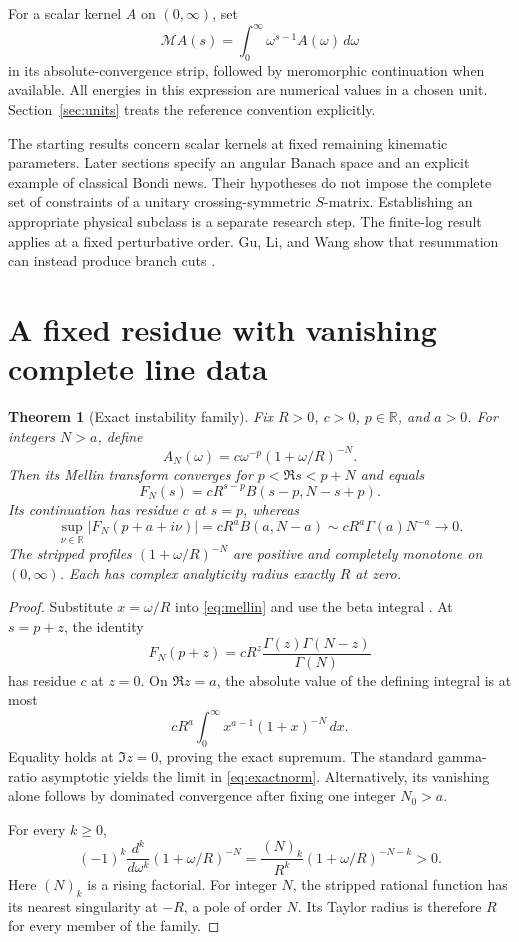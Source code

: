 \documentclass[11pt]{article}
\newtheorem{theorem}{Theorem}
\theoremstyle{remark}\newtheorem{remark}[theorem]{Remark}
\newcommand{\Mell}{\mathcal M}
\begin{document}
For a scalar kernel $A$ on $(0,\infty)$, set
\begin{equation}\label{eq:mellin}
 \Mell A(s)=\int_0^\infty \omega^{s-1}A(\omega)\,d\omega
\end{equation}
in its absolute-convergence strip, followed by meromorphic continuation when available. All energies in this expression are numerical values in a chosen unit. Section~\ref{sec:units} treats the reference convention explicitly.

The starting results concern scalar kernels at fixed remaining kinematic parameters. Later sections specify an angular Banach space and an explicit example of classical Bondi news. Their hypotheses do not impose the complete set of constraints of a unitary crossing-symmetric $S$-matrix. Establishing an appropriate physical subclass is a separate research step. The finite-log result applies at a fixed perturbative order. Gu, Li, and Wang show that resummation can instead produce branch cuts \cite{gu}.

\section{A fixed residue with vanishing complete line data}
\begin{theorem}[Exact instability family]\label{thm:instability}
Fix $R>0$, $c>0$, $p\in\mathbb R$, and $a>0$. For integers $N>a$, define
\begin{equation}\label{eq:family}
 A_N(\omega)=c\omega^{-p}(1+\omega/R)^{-N}.
\end{equation}
Then its Mellin transform converges for $p<\Re s<p+N$ and equals
\begin{equation}\label{eq:beta}
 F_N(s)=cR^{s-p}B(s-p,N-s+p).
\end{equation}
Its continuation has residue $c$ at $s=p$, whereas
\begin{equation}\label{eq:exactnorm}
 \sup_{\nu\in\mathbb R}|F_N(p+a+i\nu)|
 =cR^a B(a,N-a)
 \sim cR^a\Gamma(a)N^{-a}\longrightarrow0.
\end{equation}
The stripped profiles $(1+\omega/R)^{-N}$ are positive and completely monotone on $(0,\infty)$. Each has complex analyticity radius exactly $R$ at zero.
\end{theorem}
\begin{proof}
Substitute $x=\omega/R$ into \eqref{eq:mellin} and use the beta integral \cite{dlmfbeta}. At $s=p+z$, the identity
\[
 F_N(p+z)=cR^z\frac{\Gamma(z)\Gamma(N-z)}{\Gamma(N)}
\]
has residue $c$ at $z=0$. On $\Re z=a$, the absolute value of the defining integral is at most
\[
 cR^a\int_0^\infty x^{a-1}(1+x)^{-N}\,dx.
\]
Equality holds at $\Im z=0$, proving the exact supremum. The standard gamma-ratio asymptotic yields the limit in \eqref{eq:exactnorm}. Alternatively, its vanishing alone follows by dominated convergence after fixing one integer $N_0>a$.

For every $k\ge0$,
\[
 (-1)^k\frac{d^k}{d\omega^k}(1+\omega/R)^{-N}
 =\frac{(N)_k}{R^k}(1+\omega/R)^{-N-k}>0.
\]
Here $(N)_k$ is a rising factorial. For integer $N$, the stripped rational function has its nearest singularity at $-R$, a pole of order $N$. Its Taylor radius is therefore $R$ for every member of the family.
\end{proof}
\end{document}
